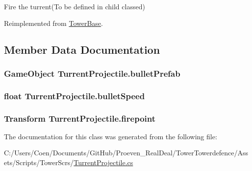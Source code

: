 Fire the turrent(\+To be defined in child classed) 



Reimplemented from \hyperlink{class_tower_base_a15cc4c8b977e8c43269c64a8013d6c0a}{Tower\+Base}.



\subsection{Member Data Documentation}
\subsubsection[{\texorpdfstring{bullet\+Prefab}{bulletPrefab}}]{\setlength{\rightskip}{0pt plus 5cm}Game\+Object Turrent\+Projectile.\+bullet\+Prefab}\hypertarget{class_turrent_projectile_aaf9dc9065f33ea6d3a16e0b24533f7b6}{}\label{class_turrent_projectile_aaf9dc9065f33ea6d3a16e0b24533f7b6}
\subsubsection[{\texorpdfstring{bullet\+Speed}{bulletSpeed}}]{\setlength{\rightskip}{0pt plus 5cm}float Turrent\+Projectile.\+bullet\+Speed}\hypertarget{class_turrent_projectile_adb7a4ba8a4056352036f5ef86cf83a26}{}\label{class_turrent_projectile_adb7a4ba8a4056352036f5ef86cf83a26}
\subsubsection[{\texorpdfstring{firepoint}{firepoint}}]{\setlength{\rightskip}{0pt plus 5cm}Transform Turrent\+Projectile.\+firepoint}\hypertarget{class_turrent_projectile_a914ca0829dc5861142f02186470a6401}{}\label{class_turrent_projectile_a914ca0829dc5861142f02186470a6401}


The documentation for this class was generated from the following file\+:\begin{DoxyCompactItemize}
\item 
C\+:/\+Users/\+Coen/\+Documents/\+Git\+Hub/\+Proeven\+\_\+\+Real\+Deal/\+Tower\+Towerdefence/\+Assets/\+Scripts/\+Tower\+Scr\textquotesingle{}s/\hyperlink{_turrent_projectile_8cs}{Turrent\+Projectile.\+cs}\end{DoxyCompactItemize}
